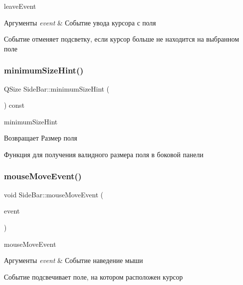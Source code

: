 leave\+Event 


\begin{DoxyParams}{Аргументы}
{\em event} & Событие увода курсора с поля\\
\hline
\end{DoxyParams}
Событие отменяет подсветку, если курсор больше не находится на выбранном поле \mbox{\label{classSideBar_a3b46466ef84c9f89677478f8b1f5bf36}} 
\subsubsection{\texorpdfstring{minimum\+Size\+Hint()}{minimumSizeHint()}}
{\footnotesize\ttfamily Q\+Size Side\+Bar\+::minimum\+Size\+Hint (\begin{DoxyParamCaption}{ }\end{DoxyParamCaption}) const}



minimum\+Size\+Hint 

\begin{DoxyReturn}{Возвращает}
Размер поля
\end{DoxyReturn}
Функция для получения валидного размера поля в боковой панели \mbox{\label{classSideBar_a1c00fa33ba20510bf7d50dfa757a8515}} 
\subsubsection{\texorpdfstring{mouse\+Move\+Event()}{mouseMoveEvent()}}
{\footnotesize\ttfamily void Side\+Bar\+::mouse\+Move\+Event (\begin{DoxyParamCaption}\item[{Q\+Mouse\+Event $\ast$}]{event }\end{DoxyParamCaption})\hspace{0.3cm}{\ttfamily [protected]}}



mouse\+Move\+Event 


\begin{DoxyParams}{Аргументы}
{\em event} & Событие наведение мыши\\
\hline
\end{DoxyParams}
Событие подсвечивает поле, на котором расположен курсор \mbox{\label{classSideBar_ae3923b2d85345b3f7b899ce6becd21fb}} 
